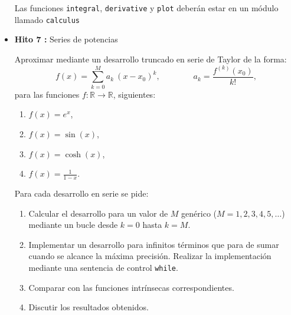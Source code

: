 \documentclass[12pt,spanish]{article}
\begin{document}
\begin{itemize}

Las funciones \texttt{integral}, \texttt{derivative} y \texttt{plot} deberán 
estar en un módulo llamado \texttt{calculus}      


\newpage 
\item {\bf Hito 7 :}  Series de potencias  

Aproximar  mediante un desarrollo truncado en serie de Taylor de la forma:
\[  f(x) = \sum_{k=0} ^M a_k \  (x-x_0)^k, \qquad \qquad a_k = \frac{  f^{(k)} 
(x_0)  }{ k! },  \]  
para las funciones $f : \mathbb{R} \rightarrow \mathbb{R}$, siguientes:    
\begin{enumerate}
	\item $f(x) = e^x$,     
	\item $f(x) = \sin(x)$,   
	\item $f(x) = \cosh(x)$, 
	\item $f(x) = \displaystyle \frac{1}{1 - x}$.               
\end{enumerate}
Para cada desarrollo en serie se pide:    



\begin{enumerate}
	\item Calcular el desarrollo para un valor de $M$ genérico ($M=1, 2, 3, 4, 5, \hdots$) mediante un bucle desde $ k=0$ 
	hasta $ k = M $. 
	\item Implementar un desarrollo para infinitos términos que para de sumar cuando se alcance la máxima precisión. 
	Realizar la implementación mediante 
	una sentencia de control  \verb|while|.   
	\item Comparar con las funciones intrínsecas correspondientes.     
	\item Discutir los resultados obtenidos.
\end{enumerate}




\end{itemize}
\end{document}
